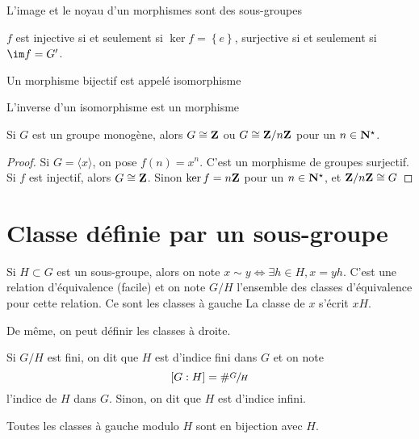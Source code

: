 \begin{prop}
L'image et le noyau d'un morphismes sont des sous-groupes
\end{prop}

\begin{prop}
$f$ est injective  si et seulement si $\ker f= \left\{ e \right\} $, surjective si et seulement si $\im f=G'$.
\end{prop}

\begin{dfn}
    Un morphisme bijectif est appelé isomorphisme
\end{dfn}

\begin{prop}
L'inverse d'un isomorphisme est un morphisme
\end{prop}

\begin{prop}
Si $G$ est un groupe monogène, alors  $G\cong \mathbf Z$ ou $G\cong {\mathbf Z} / {n\mathbf Z}$ pour un $n \in  \mathbf N^\star$.
\end{prop}

\begin{proof}
    Si  $G=\langle x\rangle$, on pose  $f(n)=x^n$. C'est un morphisme de groupes surjectif. Si  $f$ est injectif, alors  $G\cong \mathbf Z$. Sinon $\ker f=n\mathbf Z$ pour un $n \in  \mathbf N^\star$, et ${\mathbf Z} / {n\mathbf Z}\cong G$
\end{proof}

\section{Classe définie par un sous-groupe}

\begin{defprop}
Si $H\subset G$ est un sous-groupe, alors on note  $x\sim y \iff  \exists h \in  H, x=yh$. C'est une relation d'équivalence (facile) et on note $G/H$ l'ensemble des classes d'équivalence pour cette relation. Ce sont les classes à gauche La classe de $x$ s'écrit  $xH$. 

De même, on peut définir les classes à droite.
\end{defprop}

\begin{dfn}
Si $G / H$ est fini, on dit que  $H$ est d'indice fini dans  $G$ et on note  \[
    [G:H]=\# \sfrac GH
\] 
l'indice de $H$ dans  $G$. Sinon, on dit que  $H$ est d'indice infini.
\end{dfn}

\begin{prop}
Toutes les classes à gauche modulo $H$ sont en bijection avec $H$.
\end{prop}

